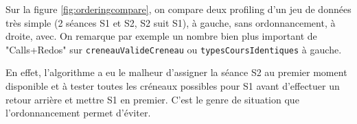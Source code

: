 Sur la figure \ref{fig:orderingcompare}, on compare deux profiling d'un jeu de
données très simple (2 séances S1 et S2, S2 suit S1), à gauche, sans
ordonnancement, à droite, avec.  On remarque par exemple un nombre bien plus
important de "Calls+Redos" sur \texttt{creneauValideCreneau} ou
\texttt{typesCoursIdentiques} à gauche.

En effet, l'algorithme a eu le malheur
d'assigner la séance S2 au premier moment disponible et à tester toutes les
créneaux possibles pour S1 avant d'effectuer un retour arrière et mettre S1 en
premier.
C'est le genre de situation que l'ordonnancement permet d'éviter.
